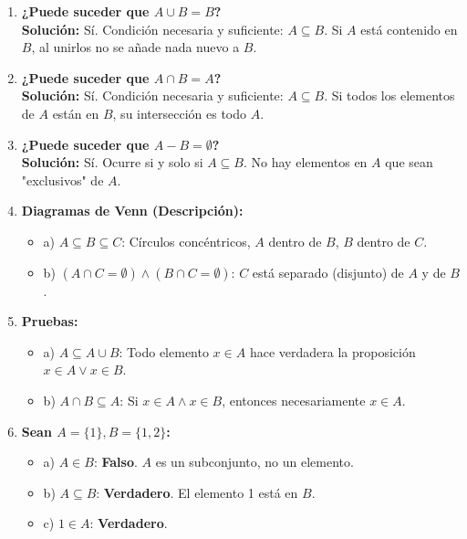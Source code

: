 \documentclass[letterpaper, 12pt]{article}
\begin{document}
\begin{enumerate}
    \item \textbf{¿Puede suceder que $A \cup B = B$?} \\
    \textbf{Solución:} Sí. Condición necesaria y suficiente: $A \subseteq B$. Si $A$ está contenido en $B$, al unirlos no se añade nada nuevo a $B$.
    
    \item \textbf{¿Puede suceder que $A \cap B = A$?} \\
    \textbf{Solución:} Sí. Condición necesaria y suficiente: $A \subseteq B$. Si todos los elementos de $A$ están en $B$, su intersección es todo $A$.
    
    \item \textbf{¿Puede suceder que $A - B = \emptyset$?} \\
    \textbf{Solución:} Sí. Ocurre si y solo si $A \subseteq B$. No hay elementos en $A$ que sean "exclusivos" de $A$.

    \item \textbf{Diagramas de Venn (Descripción):}
    \begin{itemize}
        \item a) $A \subseteq B \subseteq C$: Círculos concéntricos, $A$ dentro de $B$, $B$ dentro de $C$.
        \item b) $(A \cap C = \emptyset) \land (B \cap C = \emptyset)$: $C$ está separado (disjunto) de $A$ y de $B$.
    \end{itemize}

    \item \textbf{Pruebas:}
    \begin{itemize}
        \item a) $A \subseteq A \cup B$: Todo elemento $x \in A$ hace verdadera la proposición $x \in A \lor x \in B$.
        \item b) $A \cap B \subseteq A$: Si $x \in A \land x \in B$, entonces necesariamente $x \in A$.
    \end{itemize}

    \item \textbf{Sean $A=\{1\}, B=\{1,2\}$:}
    \begin{itemize}
        \item a) $A \in B$: \textbf{Falso}. $A$ es un subconjunto, no un elemento.
        \item b) $A \subseteq B$: \textbf{Verdadero}. El elemento 1 está en $B$.
        \item c) $1 \in A$: \textbf{Verdadero}.
    \end{itemize}


\end{enumerate}
\end{document}
